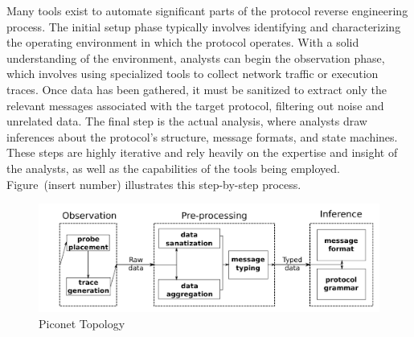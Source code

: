 Many tools exist to automate significant parts of the protocol reverse engineering process. The initial setup phase typically involves identifying and characterizing the operating environment in which the protocol operates. With a solid understanding of the environment, analysts can begin the observation phase, which involves using specialized tools to collect network traffic or execution traces. Once data has been gathered, it must be sanitized to extract only the relevant messages associated with the target protocol, filtering out noise and unrelated data. The final step is the actual analysis, where analysts draw inferences about the protocol’s structure, message formats, and state machines. These steps are highly iterative and rely heavily on the expertise and insight of the analysts, as well as the capabilities of the tools being employed. Figure~(insert number) illustrates this step-by-step process.

\begin{figure}[h]
	\caption{Piconet Topology}
	\includegraphics{protocol_analysis_process.png}
\end{figure}

